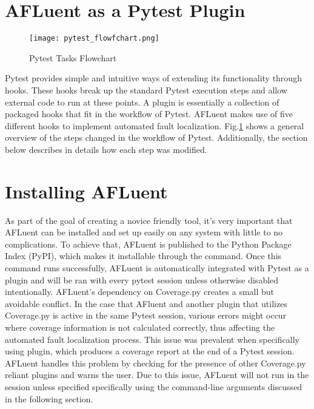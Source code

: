 \section{AFLuent as a Pytest Plugin}
\label{sec:makingPytestPlugin}

\begin{figure}[!htb]
	\begin{center}
		\texttt{[image: pytest\_flowfchart.png]}
		\caption{\label{fig:pytest_flow} Pytest Tasks Flowchart}
	\end{center}
\end{figure}

Pytest provides simple and intuitive ways of extending its functionality through
hooks. These hooks break up the standard Pytest execution steps and allow
external code to run at these points. A plugin is essentially a collection of
packaged hooks that fit in the workflow of Pytest. AFLuent makes use of five
different hooks to implement automated fault localization.
Fig.\ref{fig:pytest_flow} shows a general overview of the steps changed in the
workflow of Pytest. Additionally, the section below describes in details how each
step was modified.

\section{Installing AFLuent}
\label{subsec:afluent_install}

As part of the goal of creating a novice friendly tool, it's very important that
AFLuent can be installed and set up easily on any system with little to no
complications. To achieve that, AFLuent is published to the Python Package Index
(PyPI), which makes it installable through the 
command. Once this command runs successfully, AFLuent is automatically
integrated with Pytest as a plugin and will be ran with every pytest session
unless otherwise disabled intentionally. AFLuent's dependency on Coverage.py
creates a small but avoidable conflict. In the case that AFluent and another plugin that
utilizes Coverage.py is active in the same Pytest session, various errors might
occur where coverage information is not calculated correctly, thus affecting the
automated fault localization process. This issue was prevalent when specifically
using  plugin, which produces a coverage report at the end of a
Pytest session. AFLuent handles this problem by checking for the presence of
other Coverage.py reliant plugins and warns the user. Due to this issue,
AFLuent will not run in the session unless specified specifically using the
command-line arguments discussed in the following section.

